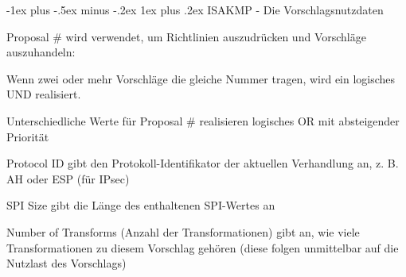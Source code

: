\documentclass[a4paper]{article}
\makeatletter
\renewcommand{\subsubsection}{\@startsection{subsubsection}{3}{0mm}%
 {-1ex plus -.5ex minus -.2ex}%
 {1ex plus .2ex}%
 {\normalfont\small\bfseries}}
\makeatother
\begin{document}
\begin{multicols}{3}
\begin{itemize*}
            \subsubsection{ISAKMP - Die
                  Vorschlagsnutzdaten}
            \begin{itemize*}
                  \item Proposal \# wird verwendet, um Richtlinien auszudrücken und Vorschläge
                  auszuhandeln:
                  \begin{itemize*}
                        \item Wenn zwei oder mehr Vorschläge die gleiche Nummer tragen, wird ein logisches UND realisiert.
                        \item Unterschiedliche Werte für Proposal \# realisieren logisches OR mit absteigender Priorität
                  \end{itemize*}
                  \item Protocol ID gibt den Protokoll-Identifikator der aktuellen Verhandlung
                  an, z. B. AH oder ESP (für IPsec)
                  \item SPI Size gibt die Länge des enthaltenen SPI-Wertes an
                  \item Number of Transforms (Anzahl der Transformationen) gibt an, wie viele
                  Transformationen zu diesem Vorschlag gehören (diese folgen unmittelbar
                  auf die Nutzlast des Vorschlags)
            \end{itemize*}


\end{itemize*}
\end{multicols}
\end{document}
